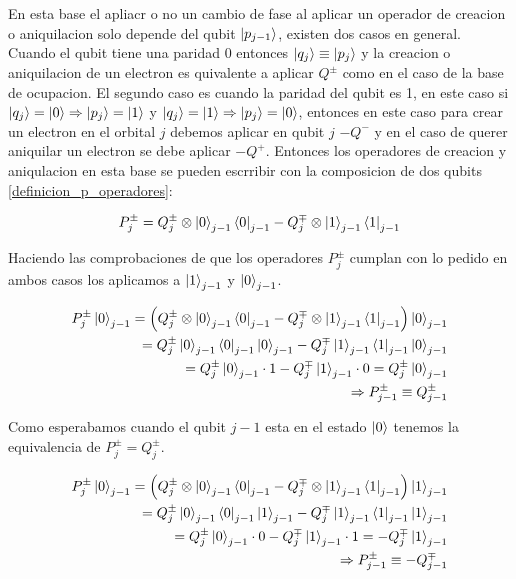 \documentclass[12pt, oneside]{article}
\begin{document}
En esta base el apliacr o no un cambio de fase al aplicar un operador de creacion o aniquilacion solo depende del qubit $\ket{p_{j-1}}$, existen dos casos en general. Cuando el qubit tiene una paridad 0 entonces $\ket{q_j}\equiv\ket{p_j}$ y la creacion o aniquilacion de un electron es quivalente a aplicar $Q^{\pm}$ como en el caso de la base de ocupacion. El segundo caso es cuando la paridad del qubit es 1, en este caso si $\ket{q_j}=\ket{0}\Rightarrow\ket{p_j}=\ket{1}$ y $\ket{q_j}=\ket{1}\Rightarrow\ket{p_j}=\ket{0}$, entonces en este caso para crear un electron en el orbital $j$ debemos aplicar en qubit $j$ $-Q^-$ y en el caso de querer aniquilar un electron se debe aplicar $-Q^+$. Entonces los operadores de creacion y aniqulacion en esta base se pueden escrribir con la composicion de dos qubits \ref{definicion_p_operadores}:

\begin{equation}\label{definicion_p_operadores}
    P_j^{\pm}=Q_j^{\pm}\otimes\ket{0}_{j-1}\bra{0}_{j-1}-Q^\mp_j\otimes\ket{1}_{j-1}\bra{1}_{j-1}
\end{equation}

Haciendo las comprobaciones de que los operadores $P^\pm_j$ cumplan con lo pedido en ambos casos los aplicamos a $\ket{1}_{j-1}$ y $\ket{0}_{j-1}$.

\begin{equation}\begin{split}
    P^{\pm}_j\ket{0}_{j-1}=\left(Q_j^{\pm}\otimes\ket{0}_{j-1}\bra{0}_{j-1}-Q^\mp_j\otimes\ket{1}_{j-1}\bra{1}_{j-1}\right)\ket{0}_{j-1}\\= Q_j^{\pm}\ket{0}_{j-1}\bra{0}_{j-1}\ket{0}_{j-1}-Q^\mp_j\ket{1}_{j-1}\bra{1}_{j-1}\ket{0}_{j-1}\\=Q_j^{\pm}\ket{0}_{j-1}\cdot1-Q^\mp_j\ket{1}_{j-1}\cdot0=Q_j^{\pm}\ket{0}_{j-1}\\
    \Rightarrow P^\pm_{j-1}\equiv Q^{\pm}_{j-1}
\end{split}  
\end{equation}

Como esperabamos cuando el qubit $j-1$ esta en el estado $\ket{0}$ tenemos la equivalencia de $P^\pm_{j}=Q^\pm_{j}$.

\begin{equation}
    \begin{split}
        P^{\pm}_j\ket{0}_{j-1}=\left(Q_j^{\pm}\otimes\ket{0}_{j-1}\bra{0}_{j-1}-Q^\mp_j\otimes\ket{1}_{j-1}\bra{1}_{j-1}\right)\ket{1}_{j-1}\\= Q_j^{\pm}\ket{0}_{j-1}\bra{0}_{j-1}\ket{1}_{j-1}-Q^\mp_j\ket{1}_{j-1}\bra{1}_{j-1}\ket{1}_{j-1}\\=Q_j^{\pm}\ket{0}_{j-1}\cdot0-Q^\mp_j\ket{1}_{j-1}\cdot1=-Q^\mp_j\ket{1}_{j-1}\\
    \Rightarrow P^\pm_{j-1}\equiv -Q^{\mp}_{j-1}
    \end{split}
\end{equation}
\end{document}
